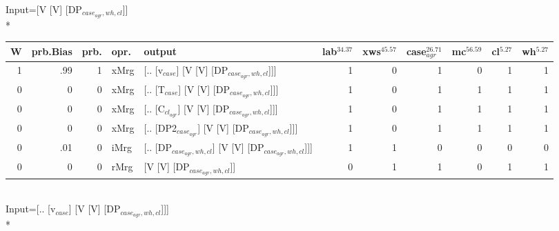 \begingroup\scriptsize Input=[V [V] [DP$_{case_{agr},wh,cl}$]]\\*
\begin{tabularx}{\linewidth}{rrrlXrrrrrr}
\hline
   W &   prb.Bias &   prb. & opr.   & output                                               &   lab$^{34.37}$ &   xws$^{45.57}$ &   case$_{agr}^{26.71}$ &   mc$^{56.59}$ &   cl$^{5.27}$ &   wh$^{5.27}$ \\
\hline
   1 &       .99 &   1 & xMrg & [.. [v$_{case}$] [V [V] [DP$_{case_{agr},wh,cl}$]]]            &             1 &             0 &                  1 &            0 &        1 &        1 \\
   0 &       0 &   0 & xMrg & [.. [T$_{case}$] [V [V] [DP$_{case_{agr},wh,cl}$]]]            &             1 &             0 &                  1 &            1 &        1 &        1 \\
   0 &       0 &   0 & xMrg & [.. [C$_{cl_{agr}}$] [V [V] [DP$_{case_{agr},wh,cl}$]]]          &             1 &             0 &                  1 &            1 &        1 &        1 \\
   0 &       0 &   0 & xMrg & [.. [DP2$_{case_{agr}}$] [V [V] [DP$_{case_{agr},wh,cl}$]]]      &             1 &             0 &                  1 &            1 &        1 &        1 \\
   0 &       .01 &   0 & iMrg & [.. [DP$_{case_{agr},wh,cl}$] [V [V] [DP$_{case_{agr},wh,cl}$]]] &             1 &             1 &                  0 &            0 &        0 &        0 \\
   0 &       0 &   0 & rMrg & [V [V] [DP$_{case_{agr},wh,cl}$]]                          &             0 &             1 &                  1 &            0 &        1 &        1 \\
\hline
\end{tabularx}\endgroup\\
\begingroup\scriptsize Input=[.. [v$_{case}$] [V [V] [DP$_{case_{agr},wh,cl}$]]]\\*
